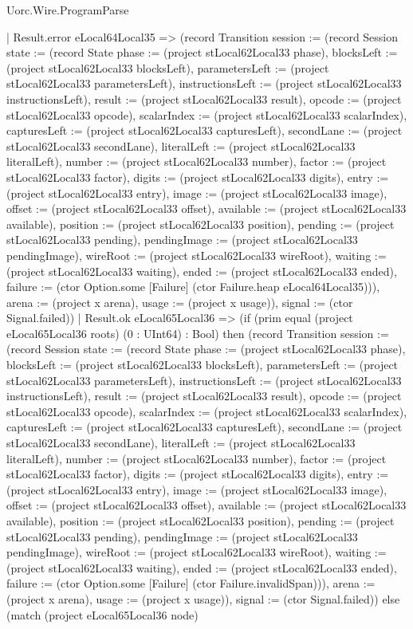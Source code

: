 \begin{lexlean}{Uorc.Wire.ProgramParse}
\begin{semanticmodule}
{      | Result.error eLocal64Local35 => (record Transition {session := (record Session {state := (record State {phase := (project stLocal62Local33 phase), blocksLeft := (project stLocal62Local33 blocksLeft), parametersLeft := (project stLocal62Local33 parametersLeft), instructionsLeft := (project stLocal62Local33 instructionsLeft), result := (project stLocal62Local33 result), opcode := (project stLocal62Local33 opcode), scalarIndex := (project stLocal62Local33 scalarIndex), capturesLeft := (project stLocal62Local33 capturesLeft), secondLane := (project stLocal62Local33 secondLane), literalLeft := (project stLocal62Local33 literalLeft), number := (project stLocal62Local33 number), factor := (project stLocal62Local33 factor), digits := (project stLocal62Local33 digits), entry := (project stLocal62Local33 entry), image := (project stLocal62Local33 image), offset := (project stLocal62Local33 offset), available := (project stLocal62Local33 available), position := (project stLocal62Local33 position), pending := (project stLocal62Local33 pending), pendingImage := (project stLocal62Local33 pendingImage), wireRoot := (project stLocal62Local33 wireRoot), waiting := (project stLocal62Local33 waiting), ended := (project stLocal62Local33 ended), failure := (ctor Option.some [Failure] (ctor Failure.heap eLocal64Local35))}), arena := (project x arena), usage := (project x usage)}), signal := (ctor Signal.failed)})
      | Result.ok eLocal65Local36 => (if (prim equal (project eLocal65Local36 roots) (0 : UInt64) : Bool) then (record Transition {session := (record Session {state := (record State {phase := (project stLocal62Local33 phase), blocksLeft := (project stLocal62Local33 blocksLeft), parametersLeft := (project stLocal62Local33 parametersLeft), instructionsLeft := (project stLocal62Local33 instructionsLeft), result := (project stLocal62Local33 result), opcode := (project stLocal62Local33 opcode), scalarIndex := (project stLocal62Local33 scalarIndex), capturesLeft := (project stLocal62Local33 capturesLeft), secondLane := (project stLocal62Local33 secondLane), literalLeft := (project stLocal62Local33 literalLeft), number := (project stLocal62Local33 number), factor := (project stLocal62Local33 factor), digits := (project stLocal62Local33 digits), entry := (project stLocal62Local33 entry), image := (project stLocal62Local33 image), offset := (project stLocal62Local33 offset), available := (project stLocal62Local33 available), position := (project stLocal62Local33 position), pending := (project stLocal62Local33 pending), pendingImage := (project stLocal62Local33 pendingImage), wireRoot := (project stLocal62Local33 wireRoot), waiting := (project stLocal62Local33 waiting), ended := (project stLocal62Local33 ended), failure := (ctor Option.some [Failure] (ctor Failure.invalidSpan))}), arena := (project x arena), usage := (project x usage)}), signal := (ctor Signal.failed)}) else (match (project eLocal65Local36 node)
}
\end{semanticmodule}
\end{lexlean}
